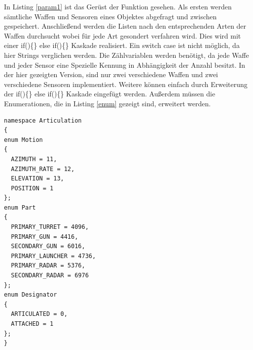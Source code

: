 In Listing \ref{param1} ist das Gerüst der Funktion gesehen. Als ersten werden sämtliche Waffen und Sensoren eines Objektes abgefragt und zwischen gespeichert. Anschließend werden die Listen nach den entsprechenden Arten der Waffen durchsucht wobei für jede Art gesondert verfahren wird. Dies wird mit einer \glqq if()\{\} else if()\{\}\grqq{} Kaskade realisiert. Ein \glqq switch case \grqq{} ist nicht möglich, da hier Strings verglichen werden. Die Zählvariablen werden benötigt, da jede Waffe und jeder Sensor eine Spezielle Kennung in Abhängigkeit der Anzahl besitzt. In der hier gezeigten Version, sind nur zwei verschiedene Waffen und zwei verschiedene Sensoren implementiert. Weitere können einfach durch Erweiterung der  \glqq if()\{\} else if()\{\}\grqq{} Kaskade eingefügt werden. Außerdem müssen die Enumerationen, die in Listing \ref{enum} gezeigt sind, erweitert werden. 
\begin{lstlisting}[caption = Parameter Enumeration ,label= enum]
namespace Articulation
{
enum Motion
{
  AZIMUTH = 11,
  AZIMUTH_RATE = 12,
  ELEVATION = 13,
  POSITION = 1
};
enum Part
{
  PRIMARY_TURRET = 4096,
  PRIMARY_GUN = 4416,
  SECONDARY_GUN = 6016,
  PRIMARY_LAUNCHER = 4736,
  PRIMARY_RADAR = 5376,
  SECONDARY_RADAR = 6976
};
enum Designator
{
  ARTICULATED = 0,
  ATTACHED = 1
};
}

\end{lstlisting}

